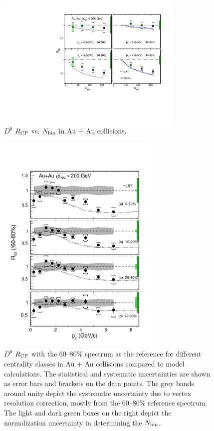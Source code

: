 \begin{figure}
\centering
\includegraphics[width=0.8\textwidth]{figure/Run14_D0HFT/Rcp_Nbin_D0.pdf}
\caption{$D^{0}$ $R_{\rm CP}$ vs. $N_{\rm bin}$ in Au + Au collisions.}
\label{Rcp_Nbin_D0} 
\end{figure}


\begin{figure}
\centering
\includegraphics[width=0.68\textwidth]{figure/Run14_D0HFT/D0_Rcp11.pdf}
\caption{$D^{0}$ $R_{\rm CP}$ with the 60--80\% spectrum as the reference for different centrality classes in Au + Au collisions compared to model calculations. The statistical and systematic uncertainties are shown as error bars and brackets on the data points. The grey bands around unity depict the systematic uncertainty due to vertex resolution correction, mostly from the 60--80\% reference spectrum. The light and dark green boxes on the right depict the normalization uncertainty in determining the $N_{\rm bin}$.}
\label{D0_Rcp11} 
\end{figure}

